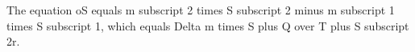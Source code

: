The equation oS equals m subscript 2 times S subscript 2 minus m subscript 1 times S subscript 1, which equals Delta m times S plus Q over T plus S subscript 2r.